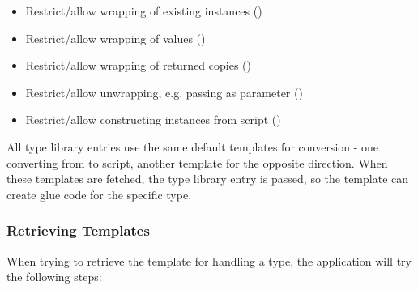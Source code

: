 \vspace{-10pt}
\begin{itemize}\addtolength{\itemsep}{-0.5\baselineskip}
\item Restrict/allow wrapping of existing instances ()
\item Restrict/allow wrapping of  values ()
\item Restrict/allow wrapping of returned copies ()
\item Restrict/allow unwrapping, e.g. passing as parameter ()
\item Restrict/allow constructing instances from script ()
\end{itemize}
\vspace{-10pt}

All type library entries use the same default templates for conversion - one converting from  to script, another template for the opposite direction. When these templates are fetched, the type library entry is passed, so the template can create glue code for the specific type.

\subsubsection{Retrieving Templates}

When trying to retrieve the template for handling a type, the application will try the following steps:

